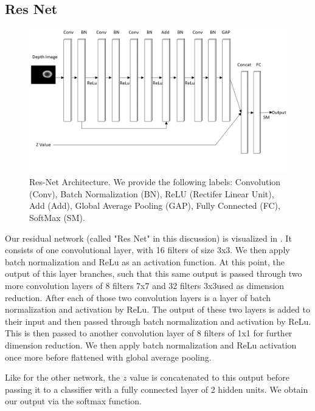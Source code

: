 \subsection{Res Net}

\begin{figure}[t!]
    \includegraphics[width=0.99\columnwidth]{figs/res_net.png}
\caption{Res-Net Architecture. We provide the following labels: Convolution (Conv), Batch Normalization (BN), ReLU (Rectifer Linear Unit), Add (Add), Global Average Pooling (GAP), Fully Connected (FC), SoftMax (SM).} \label{fig:res_net}
\end{figure}

Our residual network (called "Res Net" in this discussion) is visualized in . 
It consists of one convolutional layer, with 16 filters of size 3x3.
We then apply batch normalization and ReLu as an activation function.
At this point, the output of this layer branches, such that this same output is passed through two more convolution layers of 8 filters 7x7 and 32 filters 3x3used as dimension reduction. 
After each of those two convolution layers is a layer of batch normalization and activation by ReLu.
The output of these two layers is added to their input and then passed through batch normalization and activation by ReLu.
This is then passed to another convolution layer of 8 filters of 1x1 for further dimension reduction. 
We then apply batch normalization and ReLu activation once more before flattened with global average pooling. 

Like for the other network, the $z$ value is concatenated to this output before passing it to a classifier with a fully connected layer of 2 hidden units.
We obtain our output via the softmax function.


